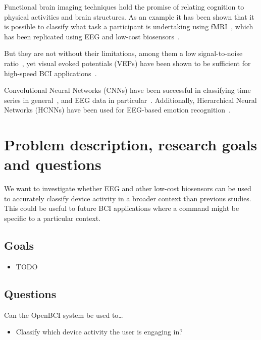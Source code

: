 \documentclass{IEEEtran}
\begin{document}
Functional brain imaging techniques hold the promise of relating cognition to physical activities and brain structures. As an example it has been shown that it is possible to classify what task a participant is undertaking using fMRI~\cite{floyd_decoding_2017}, which has been replicated using EEG and low-cost biosensors~\cite{fucci_replication_2019}.

But they are not without their limitations, among them a low signal-to-noise ratio~\cite{mcfarland_eeg-based_2017}, yet visual evoked potentials (VEPs) have been shown to be sufficient for high-speed BCI applications~\cite{spuler_high-speed_2017}.

Convolutional Neural Networks (CNNs) have been successful in classifying time series in general~\cite{zhao_convolutional_2017}, and EEG data in particular~\cite{schirrmeister_deep_2017}. Additionally, Hierarchical Neural Networks (HCNNs) have been used for EEG-based emotion recognition~\cite{li_hierarchical_2018}.


\section{Problem description, research goals and questions}

We want to investigate whether EEG and other low-cost biosensors can be used to accurately classify device activity in a broader context than previous studies. This could be useful to future BCI applications where a command might be specific to a particular context.

\subsection{Goals}

\begin{itemize}
    \item{TODO}
\end{itemize}

\subsection{Questions}

Can the OpenBCI system be used to\ldots

\begin{itemize}
    \item Classify which device activity the user is engaging in?
\end{itemize}
\end{document}
